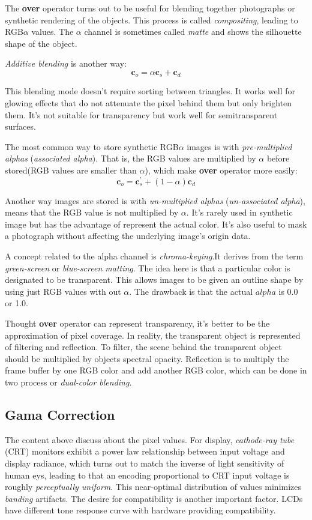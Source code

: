 \documentclass[10pt, a4paper]{article}
\begin{document}
            The \textbf{over} operator turns out to be useful for blending together photographs or synthetic rendering of the objects. This process is called \emph{compositing}, leading to RGB$\alpha$ values. The $\alpha$ channel is sometimes called \emph{matte} and shows the silhouette shape of the object. 
            
            \emph{Additive blending} is another way: 
                $$\textbf{c}_o = \alpha\textbf{c}_s + \textbf{c}_d$$

            This blending mode doesn't require sorting between triangles. It works well for glowing effects that do not attenuate the pixel behind them but only brighten them. It's not suitable for transparency but work well for semitransparent surfaces. 

            The most common way to store synthetic RGB$\alpha$ images is with \emph{pre-multiplied alphas} (\emph{associated alpha}). That is, the RGB values are multiplied by $\alpha$ before stored(RGB values are smaller than $\alpha$), which make \textbf{over} operator more easily: 
                $$\textbf{c}_o = \textbf{c}_s^{'} + (1 - \alpha)\textbf{c}_d$$

            Another way images are stored is with \emph{un-multiplied alphas} (\emph{un-associated alpha}), means that the RGB value is not multiplied by $\alpha$. It's rarely used in synthetic image but has the advantage of represent the actual color. It's also useful to mask a photograph without affecting the underlying image's origin data. 

            A concept related to the alpha channel is \emph{chroma-keying}.It derives from the term \emph{green-screen} or \emph{blue-screen matting}. The idea here is that a particular color is designated to be transparent. This allows images to be given an outline shape by using just RGB values with out $\alpha$. The drawback is that the actual $alpha$ is 0.0 or 1.0. 

            Thought \textbf{over} operator can represent transparency, it's better to be the approximation of pixel coverage. In reality, the transparent object is represented of filtering and reflection. To filter, the scene behind the transparent object should be multiplied by objects spectral opacity. Reflection is to multiply the frame buffer by one RGB color and add another RGB color, which can be done in two process or \emph{dual-color blending}. 
            
        \subsection{Gama Correction}
            The content above discuss about the pixel values. For display, \emph{cathode-ray tube} (CRT) monitors exhibit a power law relationship between input voltage and display radiance, which turns out to match the inverse of light sensitivity of human eys, leading to that an encoding proportional to CRT input voltage is roughly \emph{perceptually uniform}. This near-optimal distribution of values minimizes \emph{banding} artifacts. The desire for compatibility is another important factor. LCDs have different tone response curve with hardware providing compatibility. 
\end{document}
